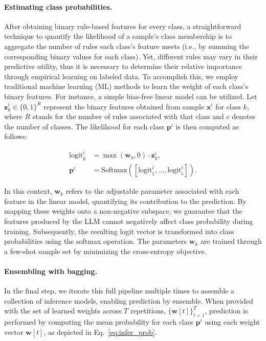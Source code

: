 \paragraph{Estimating class probabilities.} After obtaining binary rule-based features for every class, a straightforward technique to quantify the likelihood of a sample's class membership is to aggregate the number of rules each class’s feature meets (i.e., by summing the corresponding binary values for each class). Yet, different rules may vary in their predictive utility, thus it is necessary to determine their relative importance through empirical learning on labeled data. To accomplish this, we employ traditional machine learning (ML) methods to learn the weight of each class's binary features. For instance, a simple bias-free linear model can be utilized. Let $\mathbf{z}_k^i \in \{0, 1\}^R$ represent the binary features obtained from sample $\mathbf{x}^i$ for class $k$, where $R$ stands for the number of rules associated with that class and $c$ denotes the number of classes. The likelihood for each class $\mathbf{p}^i$ is then computed as follows:

\begin{align}
\text{logit}_k^i &= \max(\mathbf{w}_k, 0) \cdot \mathbf{z}_k^i, \nonumber \\
\mathbf{p}^i &= \text{Softmax}({[\text{logit}_{1}^i, ..., \text{logit}_{c}^i]}). \label{eq:infer_prob}
\end{align}

In this context, $\mathbf{w}_k$ refers to the adjustable parameter associated with each feature in the linear model, quantifying its contribution to the prediction. By mapping these weights onto a non-negative subspace, we guarantee that the features produced by the LLM cannot negatively affect class probability during training. Subsequently, the resulting logit vector is transformed into class probabilities using the softmax operation. The parameters $\mathbf{w}_k$ are trained through a few-shot sample set by minimizing the cross-entropy objective.

\vspace*{-0.12in}
\paragraph{Ensembling with bagging.} In the final step, we iterate this full pipeline multiple times to assemble a collection of inference models, enabling prediction by ensemble. When provided with the set of learned weights across $T$ repetitions, $\{\mathbf{w}[t]\}_{t=1}^T$, prediction is performed by computing the mean probability for each class $\mathbf{p}^i$ using each weight vector $\mathbf{w}[t]$, as depicted in Eq.~\ref{eq:infer_prob}.

